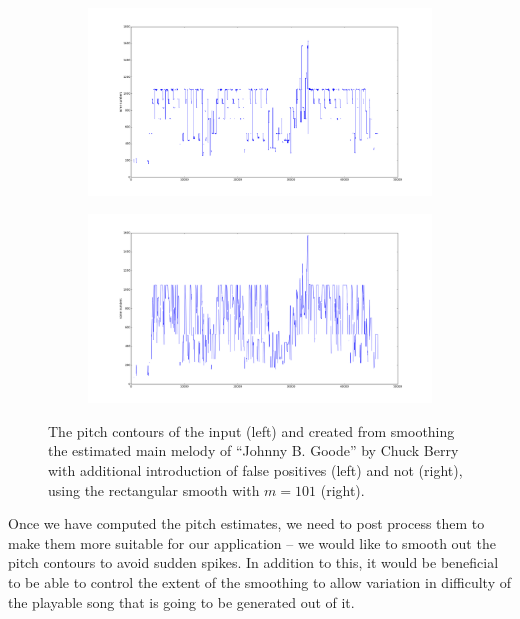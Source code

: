 \begin{figure}[b]     
        \centering
        \begin{subfigure}[b]{0.48\textwidth}
                \includegraphics[width=\textwidth]{Figures/input_simple}
                \vspace{20pt}
        \end{subfigure}
        \begin{subfigure}[b]{0.48\textwidth}
                \includegraphics[width=\textwidth]{Figures/rect_101}
                \vspace{20pt}
        \end{subfigure}
    \caption{The pitch contours of the input (left) and created from smoothing the estimated main melody of ``Johnny B. Goode'' by Chuck Berry with additional introduction of false positives (left) and not (right), using the rectangular smooth with $m=101$ (right).}
	\label{fig:rectangular}
\end{figure}

Once we have computed the pitch estimates, we need to post process them to make them more suitable for our application -- we would like to smooth out the pitch contours to avoid sudden spikes. In addition to this, it would be beneficial to be able to control the extent of the smoothing to allow variation in difficulty of the playable song that is going to be generated out of it. 

